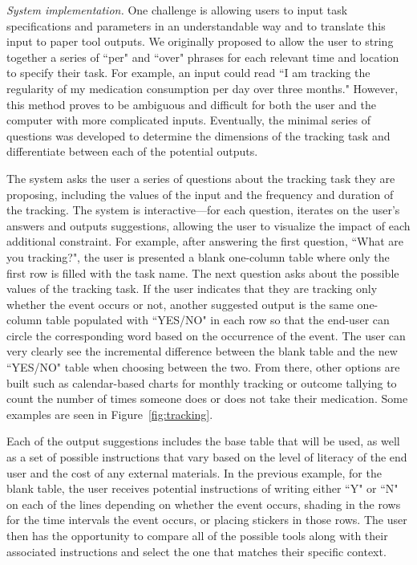 \documentclass{sig-alternate}
\begin{document}

\emph{System implementation.}
One challenge is allowing users to input task specifications and parameters in an understandable way and to translate this input to paper tool outputs. We originally proposed to allow the user to string together a series of ``per" and ``over" phrases for each relevant time and location to specify their task. For example, an input could read ``I am tracking the regularity of my medication consumption per day over three months." However, this method proves to be ambiguous and difficult for both the user and the computer with more complicated inputs. Eventually, the minimal series of questions was developed to determine the dimensions of the tracking task and differentiate between each of the potential outputs. 

The system asks the user a series of questions about the tracking task they are proposing, including the values of the input and the frequency and duration of the tracking. The system is interactive---for each question, \nifty iterates on the user's answers and outputs suggestions, allowing the user to visualize the impact of each additional constraint. For example, after answering the first question, ``What are you tracking?", the user is presented a blank one-column table where only the first row is filled with the task name. The next question asks about the possible values of the tracking task. If the user indicates that they are tracking only whether the event occurs or not, another suggested output is the same one-column table populated with ``YES/NO" in each row so that the end-user can circle the corresponding word based on the occurrence of the event. The user can very clearly see the incremental difference between the blank table and the new ``YES/NO" table when choosing between the two. From there, other options are built such as calendar-based charts for monthly tracking or outcome tallying to count the number of times someone does or does not take their medication. Some examples are seen in Figure~\ref{fig:tracking}.

Each of the output suggestions includes the base table that will be used, as well as a set of possible instructions that vary based on the level of literacy of the end user and the cost of any external materials. In the previous example, for the blank table, the user receives potential instructions of writing either ``Y" or ``N" on each of the lines depending on whether the event occurs, shading in the rows for the time intervals the event occurs, or placing stickers in those rows.  The user then has the opportunity to compare all of the possible tools along with their associated instructions and select the one that matches their specific context. 
\end{document}
